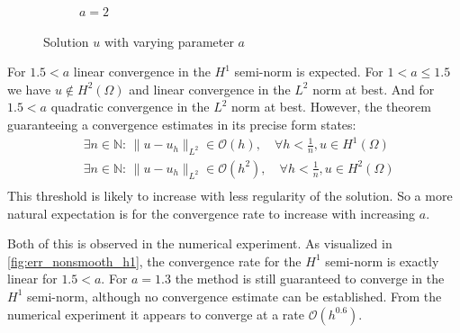\documentclass[11pt,a4paper]{article}
\begin{document}
\begin{figure}
\begin{subfigure}{.5\textwidth}
    \caption{$a = 2$}
  \end{subfigure}
  \caption{Solution $u$ with varying parameter $a$}
  \label{fig:non_smooth_mixed_solution}
\end{figure}

For $1.5 < a$ linear convergence in the $H^1$ semi-norm is expected.
For $1 < a \le 1.5$ we have $u \notin H^2(\Omega)$ and linear convergence in the $L^2$ norm at best.
And for $1.5 < a$ quadratic convergence in the $L^2$ norm at best.
However, the theorem guaranteeing a convergence estimates in its precise form states:
\begin{equation}
  \begin{split}
    &\exists n \in \mathbb{N}: \, \lVert u - u_h \rVert_{L^2} \in \mathcal{O}\left(h\right), \quad \forall h < \frac{1}{n}, u \in H^1(\Omega) \\
    &\exists n \in \mathbb{N}: \, \lVert u - u_h \rVert_{L^2} \in \mathcal{O}\left(h^2\right), \quad \forall h < \frac{1}{n}, u \in H^2(\Omega) \\
  \end{split}
\end{equation}
This threshold is likely to increase with less regularity of the solution. So a more natural
expectation is for the convergence rate to increase with increasing $a$.

Both of this is observed in the numerical experiment. As visualized in \ref{fig:err_nonsmooth_h1},
the convergence rate for the $H^1$ semi-norm is exactly linear for $1.5 < a$.
For $a = 1.3$ the method is still guaranteed to converge in the $H^1$ semi-norm, although no convergence estimate can be established.
From the numerical experiment it appears to converge at a rate $\mathcal{O}\left(h^{0.6}\right)$.
\end{document}
